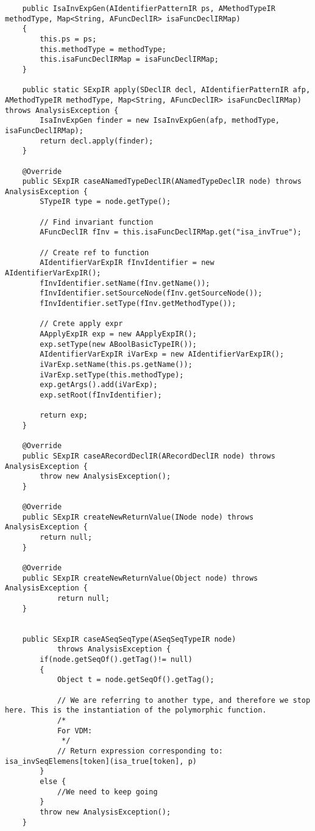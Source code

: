 \begin{appendices}
\begin{lstlisting}
    public IsaInvExpGen(AIdentifierPatternIR ps, AMethodTypeIR methodType, Map<String, AFuncDeclIR> isaFuncDeclIRMap)
    {
        this.ps = ps;
        this.methodType = methodType;
        this.isaFuncDeclIRMap = isaFuncDeclIRMap;
    }

    public static SExpIR apply(SDeclIR decl, AIdentifierPatternIR afp, AMethodTypeIR methodType, Map<String, AFuncDeclIR> isaFuncDeclIRMap) throws AnalysisException {
        IsaInvExpGen finder = new IsaInvExpGen(afp, methodType, isaFuncDeclIRMap);
        return decl.apply(finder);
    }

    @Override
    public SExpIR caseANamedTypeDeclIR(ANamedTypeDeclIR node) throws AnalysisException {
        STypeIR type = node.getType();

        // Find invariant function
        AFuncDeclIR fInv = this.isaFuncDeclIRMap.get("isa_invTrue");

        // Create ref to function
        AIdentifierVarExpIR fInvIdentifier = new AIdentifierVarExpIR();
        fInvIdentifier.setName(fInv.getName());
        fInvIdentifier.setSourceNode(fInv.getSourceNode());
        fInvIdentifier.setType(fInv.getMethodType());

        // Crete apply expr
        AApplyExpIR exp = new AApplyExpIR();
        exp.setType(new ABoolBasicTypeIR());
        AIdentifierVarExpIR iVarExp = new AIdentifierVarExpIR();
        iVarExp.setName(this.ps.getName());
        iVarExp.setType(this.methodType);
        exp.getArgs().add(iVarExp);
        exp.setRoot(fInvIdentifier);

        return exp;
    }

    @Override
    public SExpIR caseARecordDeclIR(ARecordDeclIR node) throws AnalysisException {
        throw new AnalysisException();
    }

    @Override
    public SExpIR createNewReturnValue(INode node) throws AnalysisException {
        return null;
    }

    @Override
    public SExpIR createNewReturnValue(Object node) throws AnalysisException {
            return null;
    }


    public SExpIR caseASeqSeqType(ASeqSeqTypeIR node)
            throws AnalysisException {
        if(node.getSeqOf().getTag()!= null)
        {
            Object t = node.getSeqOf().getTag();

            // We are referring to another type, and therefore we stop here. This is the instantiation of the polymorphic function.
            /*
            For VDM:
             */
            // Return expression corresponding to: isa_invSeqElemens[token](isa_true[token], p)
        }
        else {
            //We need to keep going
        }
        throw new AnalysisException();
    }


\end{lstlisting}
\end{appendices}
